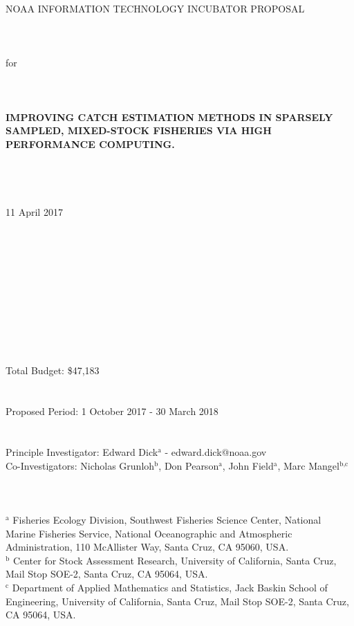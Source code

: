 \documentclass[12pt]{article}
\begin{document}
%
%

%
\noindent
\begin{centering}
NOAA INFORMATION TECHNOLOGY INCUBATOR PROPOSAL
\\$~$\\$~$\\$~$\\
for
\\$~$\\$~$\\$~$\\
{\bf IMPROVING CATCH ESTIMATION METHODS IN SPARSELY SAMPLED, MIXED-STOCK FISHERIES VIA HIGH PERFORMANCE COMPUTING.}
\\$~$\\$~$\\$~$\\$~$\\
11 April 2017\\
\end{centering}
$~$\\$~$\\$~$\\$~$\\$~$\\$~$\\$~$\\$~$\\$~$\\$~$\\
Total Budget: \$47,183
\\$~$\\$~$\\
Proposed Period: 1 October 2017 - 30 March 2018
\\$~$\\$~$\\
\noindent
Principle Investigator: Edward Dick$^\text{a}$ - edward.dick@noaa.gov\\
Co-Investigators: Nicholas Grunloh$^\text{b}$, Don Pearson$^\text{a}$, John Field$^\text{a}$, Marc Mangel$^\text{b,c}$\\
\\$~$\\$~$\\
$^\text{a}$ Fisheries Ecology Division, Southwest Fisheries Science Center, National Marine Fisheries Service, National Oceanographic and Atmospheric Administration, 110 McAllister Way, Santa Cruz, CA 95060, USA.\\
$^\text{b}$ Center for Stock Assessment Research, University of California, Santa Cruz, Mail Stop SOE-2, Santa Cruz, CA 95064, USA.\\
$^\text{c}$ Department of Applied Mathematics and Statistics, Jack Baskin School of Engineering, University of California, Santa Cruz, Mail Stop SOE-2, Santa Cruz, CA 95064, USA.
\end{document}
